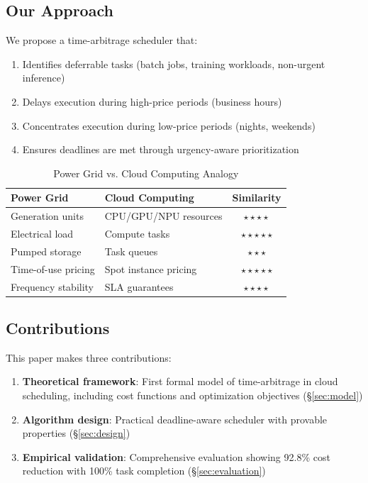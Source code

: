 \documentclass[10pt,conference]{IEEEtran}
\begin{document}
\subsection{Our Approach}

We propose a time-arbitrage scheduler that:
\begin{enumerate}
    \item Identifies deferrable tasks (batch jobs, training workloads, non-urgent inference)
    \item Delays execution during high-price periods (business hours)
    \item Concentrates execution during low-price periods (nights, weekends)
    \item Ensures deadlines are met through urgency-aware prioritization
\end{enumerate}

\begin{table}[t]
\centering
\caption{Power Grid vs. Cloud Computing Analogy}
\label{tab:analogy}
\begin{tabular}{@{}llc@{}}
\toprule
\textbf{Power Grid} & \textbf{Cloud Computing} & \textbf{Similarity} \\ \midrule
Generation units & CPU/GPU/NPU resources & $\star\star\star\star$ \\
Electrical load & Compute tasks & $\star\star\star\star\star$ \\
Pumped storage & Task queues & $\star\star\star$ \\
Time-of-use pricing & Spot instance pricing & $\star\star\star\star\star$ \\
Frequency stability & SLA guarantees & $\star\star\star\star$ \\ \bottomrule
\end{tabular}
\end{table}

\subsection{Contributions}

This paper makes three contributions:
\begin{enumerate}
    \item \textbf{Theoretical framework}: First formal model of time-arbitrage in cloud scheduling, including cost functions and optimization objectives (\S\ref{sec:model})
    \item \textbf{Algorithm design}: Practical deadline-aware scheduler with provable properties (\S\ref{sec:design})
    \item \textbf{Empirical validation}: Comprehensive evaluation showing 92.8\% cost reduction with 100\% task completion (\S\ref{sec:evaluation})
\end{enumerate}
\end{document}
